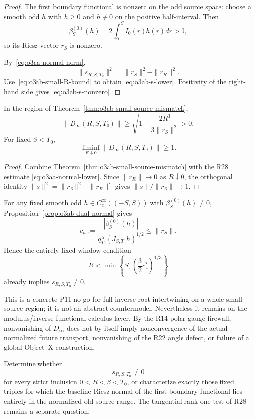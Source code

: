 \begin{proof}
The first boundary functional is nonzero on the odd source space: choose a smooth odd $h$ with $h\ge0$ and $h\not\equiv0$ on the positive half-interval.  Then
\[
 \beta_S^{(0)}(h)
 =2\int_0^SI_0(r)h(r)dr>0,
\]
so its Riesz vector $r_S$ is nonzero.

By~\eqref{eq:o3aa-normal-norm},
\[
 \|s_{R,S,T_0}\|^2
 =\|r_S\|^2-\|r_R\|^2.
\]
Use~\eqref{eq:o3ab-small-R-bound} to obtain
\eqref{eq:o3ab-s-lower}.  Positivity of the right-hand side gives
\eqref{eq:o3ab-s-nonzero}.
\end{proof}

\begin{corollary}
\label{cor:o3ab-inverse-defect}
In the region of Theorem~\ref{thm:o3ab-small-source-mismatch},
\[
 \boxed{
 \|D_\infty^-(R,S,T_0)\|
 \ge
 \sqrt{1-\frac{2R^3}{3\|r_S\|^2}}
 >0.
 }
\tag{O3AB.6}\label{eq:o3ab-D-lower}
\]
For fixed $S<T_0$,
\[
 \boxed{
 \liminf_{R\downarrow0}
 \|D_\infty^-(R,S,T_0)\|\ge1.
 }
\tag{O3AB.7}\label{eq:o3ab-D-small-R}
\]
\end{corollary}

\begin{proof}
Combine Theorem~\ref{thm:o3ab-small-source-mismatch} with the R28 estimate
\eqref{eq:o3aa-normal-lower}.  Since
$\|r_R\|\to0$ as $R\downarrow0$, the orthogonal identity
$\|s\|^2=\|r_S\|^2-\|r_R\|^2$ gives
$\|s\|/\|r_S\|\to1$.
\end{proof}

\begin{remark}
\label{rem:o3ab-computable-threshold}
For any fixed smooth odd $h\in C_c^\infty((-S,S))$ with
$\beta_S^{(0)}(h)\ne0$, Proposition~\ref{prop:o3ab-dual-normal} gives
\[
 c_h:=\frac{|\beta_S^{(0)}(h)|}
 {q_{T_0}^X(J_{S,T_0}h)^{1/2}}
 \le\|r_S\|.
\]
Hence the entirely fixed-window condition
\[
 R<\min\left\{S,\left(\frac32c_h^2\right)^{1/3}\right\}
\]
already implies $s_{R,S,T_0}\ne0$.
\end{remark}

\begin{remark}[R29 firewall]
\label{rem:o3ab-firewall}
This is a concrete P11 no-go for full inverse-root intertwining on a whole small-source region; it is not an abstract countermodel.  Nevertheless it remains on the modulus/inverse-functional-calculus layer.  By the R14 polar-gauge firewall, nonvanishing of $D_\infty^-$ does not by itself imply nonconvergence of the actual normalized future transport, nonvanishing of the R22 angle defect, or failure of a global Object~X construction.
\end{remark}

\begin{openproblem}
\label{open:o3ab-normal-classification}
Determine whether
\[
 s_{R,S,T_0}\ne0
\]
for every strict inclusion $0<R<S<T_0$, or characterize exactly those fixed triples for which the baseline Riesz normal of the first boundary functional lies entirely in the normalized old-source range.  The tangential rank-one test of R28 remains a separate question.
\end{openproblem}
